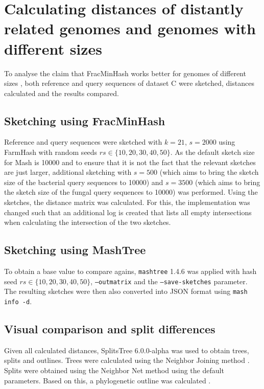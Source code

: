 \section{Calculating distances of distantly related genomes and genomes with different sizes}
To analyse the claim that FracMinHash works better for genomes of different
sizes , both reference and query
sequences of dataset C were sketched, distances calculated and the results
compared. 

\subsection*{Sketching using FracMinHash}
\label{sec:intersectionlog}
Reference and query sequences were sketched with $k=21$, $s=2000$ using FarmHash
with random seeds $rs \in \{10, 20, 30, 40, 50\}$. As the default sketch size
for Mash is 10000 \cite{ondovMashFastGenome2016} and to ensure that it is not
the fact that the relevant sketches are just larger, additional sketching with
$s=500$ (which aims to bring the sketch size of the bacterial query sequences to
10000) and $s=3500$ (which aims to bring the sketch size of the fungal query
sequences to 10000) was performed. Using the sketches, the distance matrix was
calculated. For this, the implementation was changed such that an additional log
is created that lists all empty intersections when calculating the intersection
of the two sketches.

\subsection*{Sketching using MashTree}
To obtain a base value to compare agains, \texttt{mashtree} 1.4.6
\cite{katzMashtreeRapidComparison2019,ondovMashFastGenome2016} was applied with
hash seed $rs \in \{10, 20, 30, 40, 50\}$, \texttt{--outmatrix} and the
\texttt{--save-sketches} parameter. The resulting sketches were then also
converted into JSON format using \texttt{mash info -d}.

\subsection*{Visual comparison and split differences}
Given all calculated distances, SplitsTree 6.0.0-alpha
\cite{husonApplicationPhylogeneticNetworks2006} was used to obtain trees, splits
and outlines. Trees were calculated using the Neighbor Joining method
\cite{saitouNeighborjoiningMethodNew1987}. Splits were obtained using the
Neighbor Net method
\cite{bryantNeighborNetAgglomerativeMethod2004,bryantNeighborNetImprovedAlgorithms2023}
using the default parameters. Based on this, a phylogenetic outline was
calculated \cite{bagciMicrobialPhylogeneticContext2021}.

